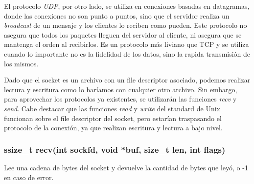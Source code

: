 \documentclass[oneside]{article}
\begin{document}
		El protocolo \emph{UDP}, por otro lado, se utiliza en conexiones basadas en datagramas, donde las conexiones no son punto a puntos, sino que el servidor realiza un \emph{broadcast} de un mensaje y los clientes lo reciben como pueden. Este protocolo no asegura que todos los paquetes lleguen del servidor al cliente, ni asegura que se mantenga el orden al recibirlos. Es un protocolo más liviano que TCP y se utiliza cuando lo importante no es la fidelidad de los datos, sino la rapida transmisión de los mismos.
		
		Dado que el socket es un archivo con un file descriptor asociado, podemos realizar lectura y escritura como lo haríamos con cualquier otro archivo. Sin embargo, para aprovechar los protocolos ya existentes, se utilizarán las funciones \emph{recv} y \emph{send}. Cabe destacar que las funciones \emph{read} y \emph{write} del standard de Unix funcionan sobre el file descriptor del socket, pero estarían traspasando el protocolo de la conexión, ya que realizan escritura y lectura a bajo nivel. 

		\subsubsection{ssize\_t recv(int sockfd, void *buf, size\_t len, int flags)}
		Lee una cadena de bytes del socket y devuelve la cantidad de bytes que leyó, o -1 en caso de error.\\
\end{document}
